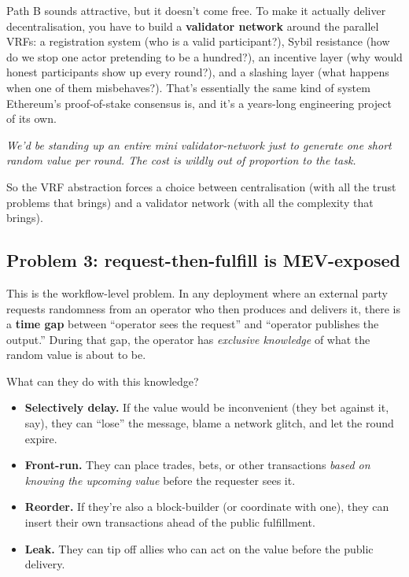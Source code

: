 \documentclass[11pt]{article}
\newenvironment{aside}{\par\medskip\noindent\itshape\small\color{black!70}}{\normalfont\par\medskip}
\begin{document}
Path B sounds attractive, but it doesn't come free. To make it actually deliver decentralisation, you have to build a \textbf{validator network} around the parallel VRFs: a registration system (who is a valid participant?), Sybil resistance (how do we stop one actor pretending to be a hundred?), an incentive layer (why would honest participants show up every round?), and a slashing layer (what happens when one of them misbehaves?). That's essentially the same kind of system Ethereum's proof-of-stake consensus is, and it's a years-long engineering project of its own.

\begin{aside}
We'd be standing up an entire mini validator-network just to generate one short random value per round. The cost is wildly out of proportion to the task.
\end{aside}

So the VRF abstraction forces a choice between centralisation (with all the trust problems that brings) and a validator network (with all the complexity that brings).

\subsection*{Problem 3: request-then-fulfill is MEV-exposed}

This is the workflow-level problem. In any deployment where an external party requests randomness from an operator who then produces and delivers it, there is a \textbf{time gap} between ``operator sees the request'' and ``operator publishes the output.'' During that gap, the operator has \emph{exclusive knowledge} of what the random value is about to be.

What can they do with this knowledge?

\begin{itemize}[leftmargin=2em, itemsep=2pt]
\item \textbf{Selectively delay.} If the value would be inconvenient (they bet against it, say), they can ``lose'' the message, blame a network glitch, and let the round expire.
\item \textbf{Front-run.} They can place trades, bets, or other transactions \emph{based on knowing the upcoming value} before the requester sees it.
\item \textbf{Reorder.} If they're also a block-builder (or coordinate with one), they can insert their own transactions ahead of the public fulfillment.
\item \textbf{Leak.} They can tip off allies who can act on the value before the public delivery.
\end{itemize}
\end{document}
